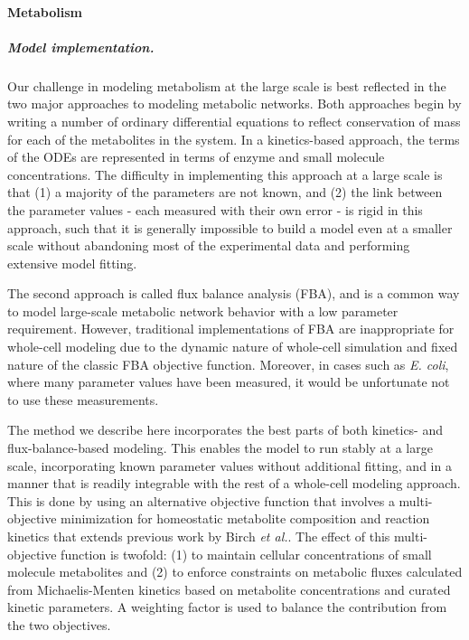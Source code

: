 \documentclass[12pt]{article}
\begin{document}
\baselineskip24pt

\paragraph{Metabolism}
\label{sec:met}

\subparagraph{Model implementation.}
Our challenge in modeling metabolism at the large scale is best reflected in the two major approaches to modeling metabolic networks.  Both approaches begin by writing a number of ordinary differential equations to reflect conservation of mass for each of the metabolites in the system.  In a kinetics-based approach, the terms of the ODEs are represented in terms of enzyme and small molecule concentrations.  The difficulty in implementing this approach at a large scale is that (1) a majority of the parameters are not known, and (2) the link between the parameter values - each measured with their own error - is rigid in this approach, such that it is generally impossible to build a model even at a smaller scale without abandoning most of the experimental data and performing extensive model fitting.

The second approach is called flux balance analysis (FBA), and is a common way to model large-scale metabolic network behavior with a low parameter requirement. However, traditional implementations of FBA are inappropriate for whole-cell modeling due to the dynamic nature of whole-cell simulation and fixed nature of the classic FBA objective function.  Moreover, in cases such as \emph{E. coli}, where many parameter values have been measured, it would be unfortunate not to use these measurements.

The method we describe here incorporates the best parts of both kinetics- and flux-balance-based modeling.  This enables the model to run stably at a large scale, incorporating known parameter values without additional fitting, and in a manner that is readily integrable with the rest of a whole-cell modeling approach. This is done by using an alternative objective function that involves a multi-objective minimization for homeostatic metabolite composition and reaction kinetics that extends previous work by Birch \emph{et al.}\cite{Birch:2014ej}. The effect of this multi-objective function is twofold: (1) to maintain cellular concentrations of small molecule metabolites and (2) to enforce constraints on metabolic fluxes calculated from Michaelis-Menten kinetics based on metabolite concentrations and curated kinetic parameters. A weighting factor is used to balance the contribution from the two objectives.
\end{document}
